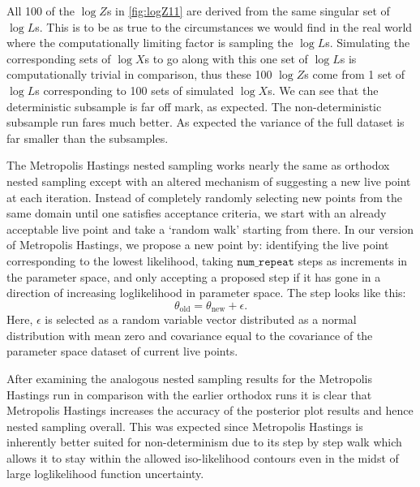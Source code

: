 All 100 of the $\log Z$s in \cref{fig:logZ11} are derived from the same singular set of $\log L$s. This is to be as true to the circumstances we would find in the real world where the computationally limiting factor is sampling the $\log L$s. Simulating the corresponding sets of $\log X$s to go along with this one set of $\log L$s is computationally trivial in comparison, thus these 100 $\log Z$s come from 1 set of $\log L$s corresponding to 100 sets of simulated $\log X$s. We can see that the deterministic subsample is far off mark, as expected. The non-deterministic subsample run fares much better. As expected the variance of the full dataset is far smaller than the subsamples.


The Metropolis Hastings nested sampling works nearly the same as orthodox nested sampling except with an altered mechanism of suggesting a new live point at each iteration. Instead of completely randomly selecting new points from the same domain until one satisfies acceptance criteria, we start with an already acceptable live point and take a `random walk' starting from there. In our version of Metropolis Hastings, we propose a new point by: identifying the live point corresponding to the lowest likelihood, taking $\texttt{num\_repeat}$ steps as increments in the parameter space, and only accepting a proposed step if it has gone in a direction of increasing loglikelihood in parameter space. The step looks like this:
%
\begin{equation}
\theta_\mathrm{old}=\theta_{\mathrm{new}}+\epsilon.    
\end{equation}
%
Here, $\epsilon$ is selected as a random variable vector distributed as a normal distribution with mean zero and covariance equal to the covariance of the parameter space dataset of current live points.




After examining the analogous nested sampling results for the Metropolis Hastings run in comparison with the earlier orthodox runs it is clear that Metropolis Hastings increases the accuracy of the posterior plot results and hence nested sampling overall. This was expected since Metropolis Hastings is inherently better suited for non-determinism due to its step by step walk which allows it to stay within the allowed iso-likelihood contours even in the midst of large loglikelihood function uncertainty.



